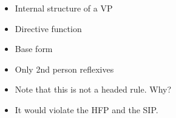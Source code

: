 \documentclass[a4paper,landscape,headrule,footrule]{foils}
\begin{document}



\begin{itemize}\addtolength{\itemsep}{-2ex}
\item Internal structure of a VP
\item Directive function
\item Base form
\item Only 2nd person reflexives
\item[Q] Note that this is not a headed rule. Why?
\item[A] It would violate the HFP and the SIP.
\end{itemize}
\end{document}
